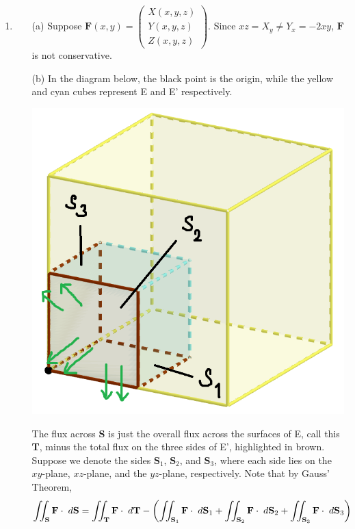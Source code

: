\documentclass{article}
\begin{document}
\begin{enumerate}
    \newpage
    \item
    \begin{enumerate}
        \item[(a)] Suppose $\textbf{F}(x,y) = \begin{pmatrix} X(x,y,z) \\ Y(x,y,z) \\ Z(x,y,z) \end{pmatrix}$. Since $xz = X_y \neq Y_x = -2xy$, $\textbf{F}$ is not conservative.
        \vspace{1cm}
        \item[(b)] In the diagram below, the black point is the origin, while the yellow and cyan cubes represent E and E' respectively.
        \begin{center}
            \includegraphics[scale=0.5]{q8b.png}
        \end{center}
        The flux across \textbf{S} is just the overall flux across the surfaces of E, call this \textbf{T}, minus the total flux on the three sides of E', highlighted in brown. Suppose we denote the sides $\textbf{S}_1$, $\textbf{S}_2$, and $\textbf{S}_3$, where each side lies on the $xy$-plane, $xz$-plane, and the $yz$-plane, respectively. Note that by Gauss' Theorem,
        \begin{align*}
            \iint_\textbf{S} \textbf{F}\cdot \hspace{1mm}d\textbf{S} &= \iint_\textbf{T} \textbf{F}\cdot \hspace{1mm}d\textbf{T} - \left(\iint_{\textbf{S}_1} \textbf{F}\cdot \hspace{1mm}d\textbf{S}_1 + \iint_{\textbf{S}_2} \textbf{F}\cdot \hspace{1mm}d\textbf{S}_2 + \iint_{\textbf{S}_3} \textbf{F}\cdot \hspace{1mm}d\textbf{S}_3\right)\\

\end{align*}
\end{enumerate}
\end{enumerate}
\end{document}

